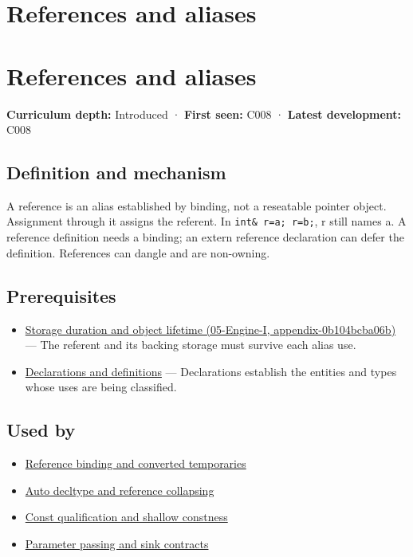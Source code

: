 \hypertarget{appendix-d6d562ca9fbb}{}
\section*{References and aliases}
\section{References and aliases}\label{references-and-aliases}

\textbf{Curriculum depth:} Introduced · \textbf{First seen:} C008 · \textbf{Latest development:} C008

\subsection{Definition and mechanism}\label{definition-and-mechanism}

A reference is an alias established by binding, not a reseatable pointer object. Assignment through it assigns the referent. In \texttt{int\&\ r=a;\ r=b;}, r still names a. A reference definition needs a binding; an extern reference declaration can defer the definition. References can dangle and are non-owning.

\subsection{Prerequisites}\label{prerequisites}

\begin{itemize}
\tightlist
\item
  \href{}{Storage duration and object lifetime (05-Engine-I, appendix-0b104bcba06b)} --- The referent and its backing storage must survive each alias use.
\item
  \hyperref[appendix-2e4d494c2d94]{Declarations and definitions} --- Declarations establish the entities and types whose uses are being classified.
\end{itemize}

\subsection{Used by}\label{used-by}

\begin{itemize}
\tightlist
\item
  \hyperref[appendix-37856d997bb0]{Reference binding and converted temporaries}
\item
  \hyperref[appendix-5d4252a42886]{Auto decltype and reference collapsing}
\item
  \hyperref[appendix-c25d60fed375]{Const qualification and shallow constness}
\item
  \hyperref[appendix-d5908f75721f]{Parameter passing and sink contracts}
\end{itemize}

